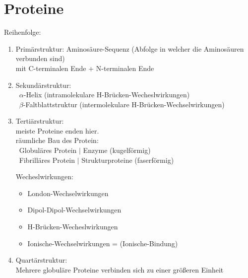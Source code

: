 \section{Proteine}
Reihenfolge:
\begin{enumerate}
    \item Primärstruktur: 
        Aminosäure-Sequenz (Abfolge in welcher die Aminosäuren verbunden sind) \\
        mit C-terminalen Ende + N-terminalen Ende
    \item Sekundärstruktur: \\
        \textrightarrow\ $\alpha$-Helix (intramolekulare H-Brücken-Wecheslwirkungen)\\
        \textrightarrow\ $\beta$-Faltblattstruktur (intermolekulare H-Brücken-Wechselwirkungen)
    \item Tertiärstruktur: \\
        meiste Proteine enden hier. \\
        räumliche Bau des Protein: \\
        \textrightarrow\ Globuläres Protein $|$ Enzyme (kugelförmig) \\
        \textrightarrow\ Fibrilläres Protein $|$ Strukturproteine (faserförmig)

        Wecheslwirkungen: 
        \begin{itemize}
            \item London-Wechselwirkungen
            \item Dipol-Dipol-Wechselwirkungen
            \item H-Brücken-Wecheslwirkungen
            \item Ionische-Wechselwirkungen = (Ionische-Bindung)
        \end{itemize}
    \item Quartärstruktur: \\
        Mehrere globuläre Proteine verbinden sich zu einer größeren Einheit
\end{enumerate}


